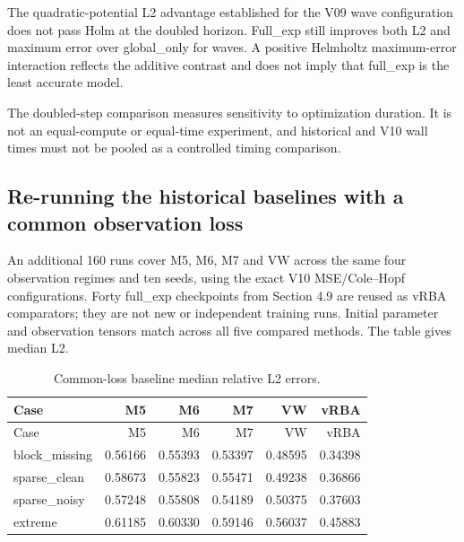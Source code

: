 \documentclass[
  11pt,
]{article}
\begin{document}
\endgroup

The quadratic-potential L2 advantage established for the V09 wave
configuration does not pass Holm at the doubled horizon. Full\_exp still
improves both L2 and maximum error over global\_only for waves. A
positive Helmholtz maximum-error interaction reflects the additive
contrast and does not imply that full\_exp is the least accurate model.

The doubled-step comparison measures sensitivity to optimization
duration. It is not an equal-compute or equal-time experiment, and
historical and V10 wall times must not be pooled as a controlled timing
comparison.

\hypertarget{re-running-the-historical-baselines-with-a-common-observation-loss}{%
\subsection{Re-running the historical baselines with a common
observation
loss}\label{re-running-the-historical-baselines-with-a-common-observation-loss}}

An additional 160 runs cover M5, M6, M7 and VW across the same four
observation regimes and ten seeds, using the exact V10 MSE/Cole--Hopf
configurations. Forty full\_exp checkpoints from Section 4.9 are reused
as vRBA comparators; they are not new or independent training runs.
Initial parameter and observation tensors match across all five compared
methods. The table gives median L2.

\begingroup\small

\begin{longtable}[]{@{}lrrrrr@{}}
\caption{Common-loss baseline median relative L2 errors.}\tabularnewline
\toprule\noalign{}
Case & M5 & M6 & M7 & VW & vRBA \\
\midrule\noalign{}
\endfirsthead
\toprule\noalign{}
Case & M5 & M6 & M7 & VW & vRBA \\
\midrule\noalign{}
\endhead
\bottomrule\noalign{}
\endlastfoot
block\_missing & 0.56166 & 0.55393 & 0.53397 & 0.48595 & 0.34398 \\
sparse\_clean & 0.58673 & 0.55823 & 0.55471 & 0.49238 & 0.36866 \\
sparse\_noisy & 0.57248 & 0.55808 & 0.54189 & 0.50375 & 0.37603 \\
extreme & 0.61185 & 0.60330 & 0.59146 & 0.56037 & 0.45883 \\
\end{longtable}

\endgroup
\end{document}
